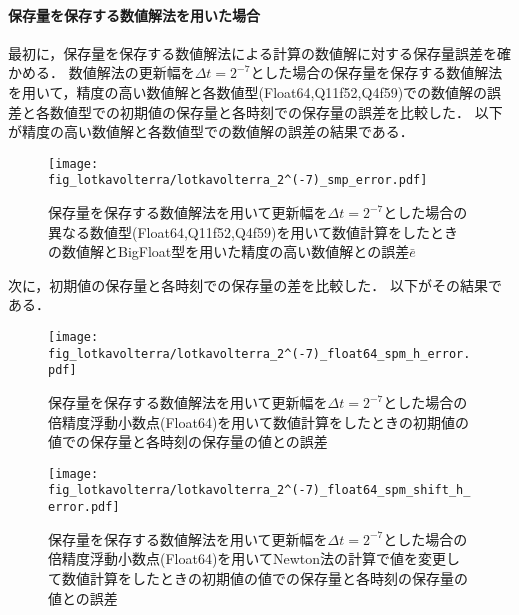 \paragraph*{保存量を保存する数値解法を用いた場合}
最初に，保存量を保存する数値解法による計算の数値解に対する保存量誤差を確かめる．
数値解法の更新幅を$\Delta t = 2^{-7}$とした場合の保存量を保存する数値解法を用いて，精度の高い数値解と各数値型(Float64,Q11f52,Q4f59)での数値解の誤差と各数値型での初期値の保存量と各時刻での保存量の誤差を比較した．
以下が精度の高い数値解と各数値型での数値解の誤差の結果である．

\begin{figure}[H]
    \centering
    \begin{minipage}[b]{0.9\columnwidth}
        \centering
        \texttt{[image: fig\_lotkavolterra/lotkavolterra\_2^(-7)\_smp\_error.pdf]}
        \caption{保存量を保存する数値解法を用いて更新幅を$\Delta t = 2^{-7}$とした場合の異なる数値型(Float64,Q11f52,Q4f59)を用いて数値計算をしたときの数値解とBigFloat型を用いた精度の高い数値解との誤差$\bar{e}$}
    \end{minipage}
\end{figure}

次に，初期値の保存量と各時刻での保存量の差を比較した．
以下がその結果である．

\begin{figure}[H]
    \centering
    \begin{minipage}[b]{0.48\columnwidth}
        \centering
        \texttt{[image: fig\_lotkavolterra/lotkavolterra\_2^(-7)\_float64\_spm\_h\_error.pdf]}
        \caption{保存量を保存する数値解法を用いて更新幅を$\Delta t = 2^{-7}$とした場合の倍精度浮動小数点(Float64)を用いて数値計算をしたときの初期値の値での保存量と各時刻の保存量の値との誤差}
        \label{fig:lotkavolterra_2^(-7)_float64_smp_h_error}
    \end{minipage}
    \hspace{0.01\columnwidth}
    \begin{minipage}[b]{0.48\columnwidth}
        \centering
        \texttt{[image: fig\_lotkavolterra/lotkavolterra\_2^(-7)\_float64\_spm\_shift\_h\_error.pdf]}
        \caption{保存量を保存する数値解法を用いて更新幅を$\Delta t =  2^{-7}$とした場合の倍精度浮動小数点(Float64)を用いてNewton法の計算で値を変更して数値計算をしたときの初期値の値での保存量と各時刻の保存量の値との誤差}
        \label{fig:lotkavolterra_2^(-7)_float64_smp_shift_h_error}
    \end{minipage}
\end{figure}

